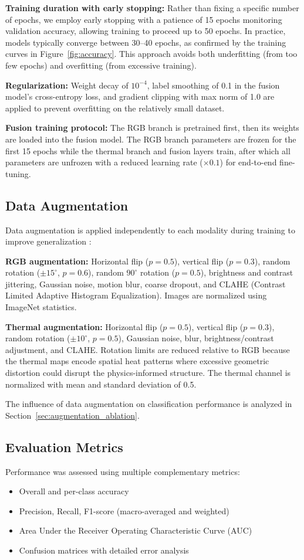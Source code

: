 \documentclass[utf8]{FrontiersinHarvard} %
\begin{document}
\textbf{Training duration with early stopping:} Rather than fixing a specific number of epochs, we employ early stopping with a patience of 15 epochs monitoring validation accuracy, allowing training to proceed up to 50 epochs. In practice, models typically converge between 30--40 epochs, as confirmed by the training curves in Figure~\ref{fig:accuracy}. This approach avoids both underfitting (from too few epochs) and overfitting (from excessive training).

\textbf{Regularization:} Weight decay of $10^{-4}$, label smoothing of 0.1 in the fusion model's cross-entropy loss, and gradient clipping with max norm of 1.0 are applied to prevent overfitting on the relatively small dataset.

\textbf{Fusion training protocol:} The RGB branch is pretrained first, then its weights are loaded into the fusion model. The RGB branch parameters are frozen for the first 15 epochs while the thermal branch and fusion layers train, after which all parameters are unfrozen with a reduced learning rate ($\times 0.1$) for end-to-end fine-tuning.

\subsection{Data Augmentation}
Data augmentation is applied independently to each modality during training to improve generalization \cite{shorten2019}:

\textbf{RGB augmentation:} Horizontal flip ($p{=}0.5$), vertical flip ($p{=}0.3$), random rotation ($\pm 15^{\circ}$, $p{=}0.6$), random $90^{\circ}$ rotation ($p{=}0.5$), brightness and contrast jittering, Gaussian noise, motion blur, coarse dropout, and CLAHE (Contrast Limited Adaptive Histogram Equalization). Images are normalized using ImageNet statistics.

\textbf{Thermal augmentation:} Horizontal flip ($p{=}0.5$), vertical flip ($p{=}0.3$), random rotation ($\pm 10^{\circ}$, $p{=}0.5$), Gaussian noise, blur, brightness/contrast adjustment, and CLAHE. Rotation limits are reduced relative to RGB because the thermal maps encode spatial heat patterns where excessive geometric distortion could disrupt the physics-informed structure. The thermal channel is normalized with mean and standard deviation of 0.5.

The influence of data augmentation on classification performance is analyzed in Section~\ref{sec:augmentation_ablation}.

\subsection{Evaluation Metrics}
Performance was assessed using multiple complementary metrics:
\begin{itemize}
    \item Overall and per-class accuracy
    \item Precision, Recall, F1-score (macro-averaged and weighted)
    \item Area Under the Receiver Operating Characteristic Curve (AUC)
    \item Confusion matrices with detailed error analysis
\end{itemize}
\end{document}
